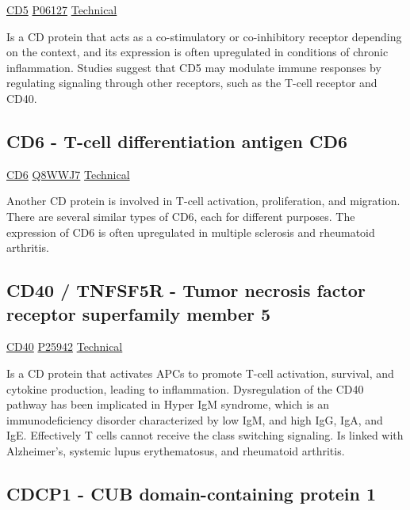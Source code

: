 \href{https://en.wikipedia.org/wiki/CD5_(protein)}{CD5}
\href{http://www.uniprot.org/uniprot/P06127}{P06127}
\href{https://olink.com/products-services/target/protein/?assayID=5106}{Technical}

Is a CD protein that acts as a co-stimulatory or co-inhibitory receptor depending on the context, and its expression is often upregulated in conditions of chronic inflammation. Studies suggest that CD5 may modulate immune responses by regulating signaling through other receptors, such as the T-cell receptor and CD40.

\subsection{CD6 - T-cell differentiation antigen CD6}

\href{https://en.wikipedia.org/wiki/CD6}{CD6}
\href{http://www.uniprot.org/uniprot/Q8WWJ7}{Q8WWJ7}
\href{https://olink.com/products-services/target/protein/?assayID=5038}{Technical}

Another CD protein is involved in T-cell activation, proliferation, and migration. There are several similar types of CD6, each for different purposes. The expression of CD6 is often upregulated in multiple sclerosis and rheumatoid arthritis.

\subsection{CD40 / TNFSF5R - Tumor necrosis factor receptor superfamily member 5}

\href{https://en.wikipedia.org/wiki/CD40_(protein)}{CD40}
\href{http://www.uniprot.org/uniprot/P25942}{P25942}
\href{https://olink.com/products-services/target/protein/?assayID=5108}{Technical}

Is a CD protein that activates APCs to promote T-cell activation, survival, and cytokine production, leading to inflammation. Dysregulation of the CD40 pathway has been implicated in Hyper IgM syndrome, which is an immunodeficiency disorder characterized by low IgM, and high IgG, IgA, and IgE. Effectively T cells cannot receive the class switching signaling. Is linked with Alzheimer's, systemic lupus erythematosus, and rheumatoid arthritis.

\subsection{CDCP1 - CUB domain-containing protein 1}

